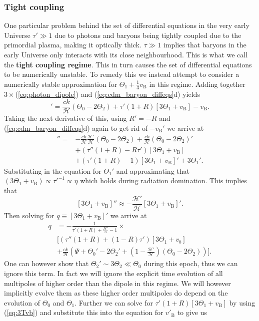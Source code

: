 \documentclass[%
reprint,
 amsmath,amssymb,
 aps,
]{revtex4-2}
\newcommand{\Hp}{\mathcal{H}}
\begin{document}
\subsubsection{Tight coupling}
One particular problem behind the set of differential equations in the very early Universe $\tau'\gg1$ due to photons and baryons being tightly coupled due to the primordial plasma, making it optically thick. $\tau\gg1$ implies that baryons in the early Universe only interacts with its close neighbourhood. This is what we call the \textbf{tight coupling regime}. This in turn causes the set of differential equations to be numerically unstable. To remedy this we instead attempt to consider a numerically stable approximation for $\Theta_1+\frac13v_\text{B}$ in this regime. Adding together $3\times$(\ref{eq:photon_dipole}) and (\ref{eq:cdm_baryon_diffeqs}d) yields
\begin{equation}
	[3\Theta_1+v_\text{B}]'=\frac{ck}{\Hp}(\Theta_0-2\Theta_2)+\tau'(1+R)[3\Theta_1+v_\text{B}]-v_\text{B}.
	\label{eq:3Tvb}
\end{equation}
Taking the next derivative of this, using $R'=-R$ and (\ref{eq:cdm_baryon_diffeqs}d) again to get rid of $-v_\text{B}'$ we arrive at
\begin{align*}
	[3\Theta_1+v_\text{B}]''=&-\frac{ck}{\Hp}\frac{\Hp'}{\Hp}(\Theta_0-2\Theta_2)+\frac{ck}{\Hp}(\Theta_0-2\Theta_2)'\\
	&+(\tau''(1+R)-R\tau')[3\Theta_1+v_\text{B}]\\
	&+(\tau'(1+R)-1)[3\Theta_1+v_\text{B}]'+3\Theta_1'.
\end{align*}
Substituting in the equation for $\Theta_1'$ and approximating that $(3\Theta_1+v_\text{B})\propto\tau'^{-1}\propto\eta$ which holds during radiation domination. This implies that
\[[3\Theta_1+v_\text{B}]''\approx-\frac{\Hp'}{\Hp}[3\Theta_1+v_\text{B}]'.\]
Then solving for $q\equiv[3\Theta_1+v_\text{B}]'$ we arrive at
\begin{align*}
	q&=-\frac{1}{\tau'(1+R)+\frac{\Hp'}{\Hp}-1}\times\\
	&\biggl[(\tau''(1+R)+(1-R)\tau')[3\Theta_1+v_b]\\
	&+\frac{ck}{\Hp}\left(\Psi+\Theta_0'-2\Theta_2'+\left(1-\frac{\Hp'}{\Hp}\right)(\Theta_0-2\Theta_2)\right)\biggr].
\end{align*}
One can however show that $\Theta_2'\sim3\Theta_2\ll\Theta_0$ during this epoch, thus we can ignore this term. In fact we will ignore the explicit time evolution of all multipoles of higher order than the dipole in this regime. We will however implicitly evolve them as these higher order multipoles do depend on the evolution of $\Theta_0$ and $\Theta_1$. Further we can solve for $\tau'(1+R)[3\Theta_1+v_\text{B}]$ by using (\ref{eq:3Tvb}) and substitute this into the equation for $v'_\text{B}$ to give us
\end{document}
